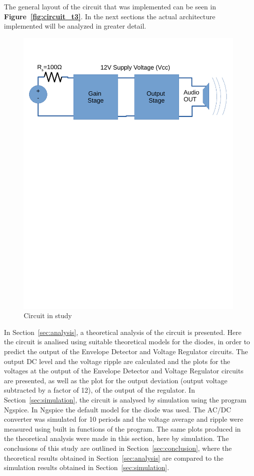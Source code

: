 The general layout of the circuit that was implemented can be seen in \textbf{Figure~\ref{fig:circuit_t3}}. In the next sections the actual architecture implemented will be analyzed in greater detail.\par
\begin{figure}[h] \centering
\includegraphics[width=0.6\linewidth]{circuit_t4.pdf}
\vspace{-6cm}
\caption{Circuit in study}
\label{fig:circuit_t4}
\end{figure}


In Section~\ref{sec:analysis}, a theoretical analysis of the circuit is
presented. Here the circuit is analised using suitable theoretical models for the diodes, in order to predict the output of the Envelope Detector
and Voltage Regulator circuits. The output DC level and the
voltage ripple are calculated and the plots for the voltages at the output of the Envelope Detector and Voltage Regulator circuits are presented, as well as the plot for the output deviation (output voltage subtracted by a factor of 12), of the output of the regulator. 
In Section~\ref{sec:simulation}, the circuit is analysed by
simulation using the program Ngspice. In Ngspice the default model for the diode was used. The AC/DC converter was simulated for 10 periods and the voltage average and ripple were measured using built in functions of the program. The same plots produced in the theoretical analysis were made in this section, here by simulation. The conclusions of this study are outlined in
Section~\ref{sec:conclusion}, where the theoretical results obtained in
Section~\ref{sec:analysis} are compared to the simulation results obtained in
Section~\ref{sec:simulation}.





\pagebreak

